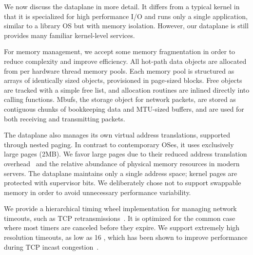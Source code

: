 We now discuss the \ix dataplane in more detail. It differs from a typical
kernel in that it is specialized for high performance I/O and runs only a single
application, similar to a library OS but with memory
isolation. However, our dataplane is still provides many
familiar kernel-level services.

For memory management, we accept some memory fragmentation in order to
reduce complexity and improve efficiency. All hot-path data objects
are allocated from per hardware thread memory pools. Each memory pool
is structured as arrays of identically sized objects, provisioned in
page-sized blocks. Free objects are tracked with a simple free list,
and allocation routines are inlined directly into calling
functions. Mbufs, the storage object for network packets, are stored
as contiguous chunks of bookkeeping data and MTU-sized buffers, and
are used for both receiving and transmitting packets.

The dataplane also manages its own virtual address translations,
supported through nested paging. In contrast to contemporary OSes, it
uses exclusively large pages (2MB). We favor large pages due to
their reduced address translation
overhead~\cite{DBLP:conf/isca/BasuGCHS13, dune} and the relative
abundance of physical memory resources in modern servers. The
dataplane maintains only a single address space; kernel pages are
protected with supervisor bits. We deliberately chose not to support
swappable memory in order to avoid unnecessary performance variability.

We provide a hierarchical timing wheel implementation for managing
network timeouts, such as TCP
retransmissions~\cite{DBLP:conf/sosp/VargheseL87}. It is optimized for
the common case where most timers are canceled before they expire. We
support extremely high resolution timeouts, as low as 16 \microsecond,
which has been shown to improve performance during TCP incast
congestion~\cite{DBLP:conf/sigcomm/VasudevanPSKAGGM09}.

